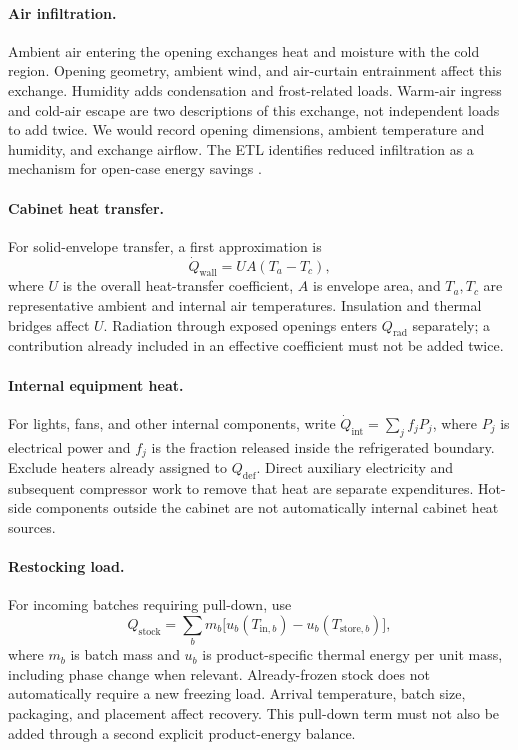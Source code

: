 \documentclass[12pt]{article}
\begin{document}
\paragraph{Air infiltration.}
Ambient air entering the opening exchanges heat and moisture with the cold region. Opening geometry, ambient wind, and air-curtain entrainment affect this exchange. Humidity adds condensation and frost-related loads. Warm-air ingress and cold-air escape are two descriptions of this exchange, not independent loads to add twice. We would record opening dimensions, ambient temperature and humidity, and exchange airflow. The ETL identifies reduced infiltration as a mechanism for open-case energy savings \cite{etl}.

\paragraph{Cabinet heat transfer.}
For solid-envelope transfer, a first approximation is
\begin{equation}
\dot Q_{\mathrm{wall}}=UA(T_a-T_c),
\end{equation}
where $U$ is the overall heat-transfer coefficient, $A$ is envelope area, and $T_a,T_c$ are representative ambient and internal air temperatures. Insulation and thermal bridges affect $U$. Radiation through exposed openings enters $Q_{\mathrm{rad}}$ separately; a contribution already included in an effective coefficient must not be added twice.

\paragraph{Internal equipment heat.}
For lights, fans, and other internal components, write
$\dot Q_{\mathrm{int}}=\sum_j f_jP_j$, where $P_j$ is electrical power and $f_j$ is the fraction released inside the refrigerated boundary. Exclude heaters already assigned to $Q_{\mathrm{def}}$. Direct auxiliary electricity and subsequent compressor work to remove that heat are separate expenditures. Hot-side components outside the cabinet are not automatically internal cabinet heat sources.

\paragraph{Restocking load.}
For incoming batches requiring pull-down, use
\begin{equation}
Q_{\mathrm{stock}}=\sum_b m_b
\bigl[u_b(T_{\mathrm{in},b})-u_b(T_{\mathrm{store},b})\bigr],
\end{equation}
where $m_b$ is batch mass and $u_b$ is product-specific thermal energy per unit mass, including phase change when relevant. Already-frozen stock does not automatically require a new freezing load. Arrival temperature, batch size, packaging, and placement affect recovery. This pull-down term must not also be added through a second explicit product-energy balance.
\end{document}
